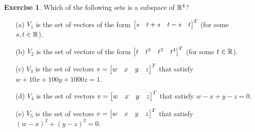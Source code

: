 \documentclass[a4paper]{amsart}
\theoremstyle{definition}
\newtheorem{exercise}{Exercise}
\begin{document}
\begin{exercise}\label{ex-subspace-ii}
 Which of the following sets is a subspace of ${\mathbb{R}}^4$?
 \begin{itemize}
  \item[(a)] $V_1$ is the set of vectors of the form
   $\left[\begin{matrix} s&t+s&t-s&t\end{matrix}\right]^T$ (for some $s,t\in{\mathbb{R}}$).
  \item[(b)] $V_2$ is the set of vectors of the form
   $\left[\begin{matrix} t&t^2&t^3&t^4\end{matrix}\right]^T$ (for some $t\in{\mathbb{R}}$).
  \item[(c)] $V_3$ is the set of vectors
   $v=\left[\begin{matrix} w&x&y&z\end{matrix}\right]^T$ that satisfy $w+10x+100y+1000z=1$.
  \item[(d)] $V_4$ is the set of vectors
   $v=\left[\begin{matrix} w&x&y&z\end{matrix}\right]^T$ that satisfy $w-x+y-z=0$.
  \item[(e)] $V_5$ is the set of vectors
   $v=\left[\begin{matrix} w&x&y&z\end{matrix}\right]^T$ that satisfy $(w-x)^2+(y-z)^2=0$.
 \end{itemize}
\end{exercise}
\end{document}
